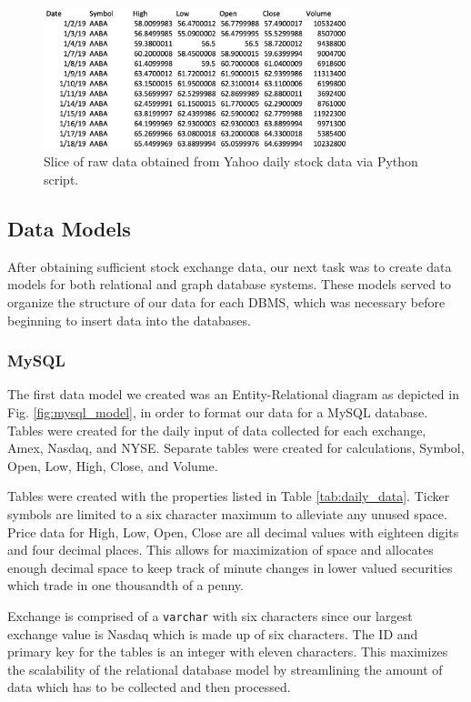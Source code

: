 \documentclass{IEEEtran}
\begin{document}
\begin{figure}
	\centering
	\includegraphics[width=3.5in]{Images/raw_stock_data.png}
	\caption{Slice of raw data obtained from Yahoo daily stock data via Python script.}
	\label{fig:raw_data}
\end{figure}

\subsection{Data Models}

After obtaining sufficient stock exchange data, our next task was to create data models for both relational and graph database systems. These models served to organize the structure of our data for each DBMS, which was necessary before beginning to insert data into the databases. 

\subsubsection{MySQL} 

The first data model we created was an Entity-Relational diagram as depicted in Fig. \ref{fig:mysql_model}, in order to format our data for a MySQL database. Tables were created for the daily input of data collected for each exchange, Amex, Nasdaq, and NYSE. Separate tables were created for calculations, Symbol, Open, Low, High, Close, and Volume. 

Tables were created with the properties listed in Table \ref{tab:daily_data}. Ticker symbols are limited to a six character maximum to alleviate any unused space. Price data for High, Low, Open, Close are all decimal values with eighteen digits and four decimal places. This allows for maximization of space and allocates enough decimal space to keep track of minute changes in lower valued securities which trade in one thousandth of a penny.  

Exchange is comprised of a \texttt{varchar} with six characters since our largest exchange value is Nasdaq which is made up of six characters. The ID and primary key for the tables is an integer with eleven characters. This maximizes the scalability of the relational database model by streamlining the amount of data which has to be collected and then processed.  
\end{document}
